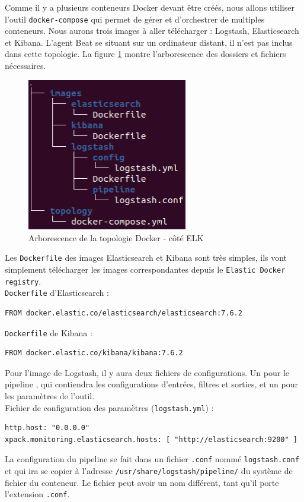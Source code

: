 \documentclass[paper=a4, fontsize=11pt]{scrartcl}
\begin{document}
Comme il y a plusieurs conteneurs Docker devant être créés, nous allons utiliser l'outil \verb,docker-compose, \cite{noauthor_overview_2020} qui permet de gérer et d'orchestrer de multiples conteneurs. Nous aurons trois images à aller télécharger : Logstash, Elasticsearch et Kibana. L'agent Beat se situant sur un ordinateur distant, il n'est pas inclus dans cette topologie. La figure \ref{f-treeDocker} montre l'arborescence des dossiers et fichiers nécessaires.
\begin{figure}[H]
    \centering
    \includegraphics[width=7cm]{img/screenshots/tree_docker.png}
    \caption{Arborescence de la topologie Docker - côté ELK}
    \label{f-treeDocker}
\end{figure}
Les \verb,Dockerfile, des images Elasticsearch et Kibana sont très simples, ils vont simplement télécharger les images correspondantes depuis le \verb,Elastic Docker registry,.\\
\verb,Dockerfile, d'Elasticsearch :
\begin{lstlisting}
FROM docker.elastic.co/elasticsearch/elasticsearch:7.6.2
\end{lstlisting}
\verb,Dockerfile, de Kibana :
\begin{lstlisting}
FROM docker.elastic.co/kibana/kibana:7.6.2
\end{lstlisting}

Pour l'image de Logstash, il y aura deux fichiers de configurations. Un pour le \og pipeline \fg, qui contiendra les configurations d'entrées, filtres et sorties, et un pour les paramètres de l'outil. \\
Fichier de configuration des paramètres (\verb,logstash.yml,) :
\begin{lstlisting}
http.host: "0.0.0.0"
xpack.monitoring.elasticsearch.hosts: [ "http://elasticsearch:9200" ]
\end{lstlisting}
La configuration du pipeline se fait dans un fichier \verb,.conf, nommé \verb,logstash.conf, et qui ira se copier à l'adresse \verb,/usr/share/logstash/pipeline/, du système de fichier du conteneur. Le fichier peut avoir un nom différent, tant qu'il porte l'extension \verb,.conf,.
\end{document}
